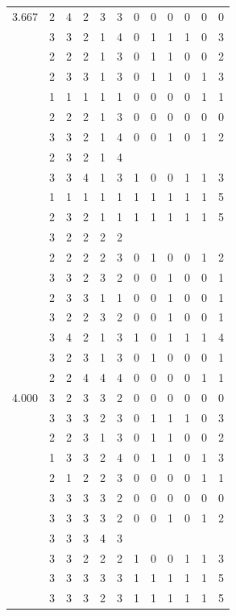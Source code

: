 \documentclass[]{book}
\theoremstyle{definition}
\theoremstyle{definition}
\theoremstyle{definition}
\theoremstyle{remark}
\begin{document}
\begin{table}
{\begin{tabular}[t]{rrrrrrrrrrrr}
3.667 & 2 & 4 & 2 & 3 & 3 & 0 & 0 & 0 & 0 & 0 & 0\\
 & 3 & 3 & 2 & 1 & 4 & 0 & 1 & 1 & 1 & 0 & 3\\
 & 2 & 2 & 2 & 1 & 3 & 0 & 1 & 1 & 0 & 0 & 2\\
 & 2 & 3 & 3 & 1 & 3 & 0 & 1 & 1 & 0 & 1 & 3\\
 & 1 & 1 & 1 & 1 & 1 & 0 & 0 & 0 & 0 & 1 & 1\\
 & 2 & 2 & 2 & 1 & 3 & 0 & 0 & 0 & 0 & 0 & 0\\
 & 3 & 3 & 2 & 1 & 4 & 0 & 0 & 1 & 0 & 1 & 2\\
 & 2 & 3 & 2 & 1 & 4 &  &  &  &  &  & \\
 & 3 & 3 & 4 & 1 & 3 & 1 & 0 & 0 & 1 & 1 & 3\\
 & 1 & 1 & 1 & 1 & 1 & 1 & 1 & 1 & 1 & 1 & 5\\
 & 2 & 3 & 2 & 1 & 1 & 1 & 1 & 1 & 1 & 1 & 5\\
 & 3 & 2 & 2 & 2 & 2 &  &  &  &  &  & \\
 & 2 & 2 & 2 & 2 & 3 & 0 & 1 & 0 & 0 & 1 & 2\\
 & 3 & 3 & 2 & 3 & 2 & 0 & 0 & 1 & 0 & 0 & 1\\
 & 2 & 3 & 3 & 1 & 1 & 0 & 0 & 1 & 0 & 0 & 1\\
 & 3 & 2 & 2 & 3 & 2 & 0 & 0 & 1 & 0 & 0 & 1\\
 & 3 & 4 & 2 & 1 & 3 & 1 & 0 & 1 & 1 & 1 & 4\\
 & 3 & 2 & 3 & 1 & 3 & 0 & 1 & 0 & 0 & 0 & 1\\
 & 2 & 2 & 4 & 4 & 4 & 0 & 0 & 0 & 0 & 1 & 1\\
4.000 & 3 & 2 & 3 & 3 & 2 & 0 & 0 & 0 & 0 & 0 & 0\\
 & 3 & 3 & 3 & 2 & 3 & 0 & 1 & 1 & 1 & 0 & 3\\
 & 2 & 2 & 3 & 1 & 3 & 0 & 1 & 1 & 0 & 0 & 2\\
 & 1 & 3 & 3 & 2 & 4 & 0 & 1 & 1 & 0 & 1 & 3\\
 & 2 & 1 & 2 & 2 & 3 & 0 & 0 & 0 & 0 & 1 & 1\\
 & 3 & 3 & 3 & 3 & 2 & 0 & 0 & 0 & 0 & 0 & 0\\
 & 3 & 3 & 3 & 3 & 2 & 0 & 0 & 1 & 0 & 1 & 2\\
 & 3 & 3 & 3 & 4 & 3 &  &  &  &  &  & \\
 & 3 & 3 & 2 & 2 & 2 & 1 & 0 & 0 & 1 & 1 & 3\\
 & 3 & 3 & 3 & 3 & 3 & 1 & 1 & 1 & 1 & 1 & 5\\
 & 3 & 3 & 3 & 2 & 3 & 1 & 1 & 1 & 1 & 1 & 5\\

\end{tabular}}
\end{table}
\end{document}
